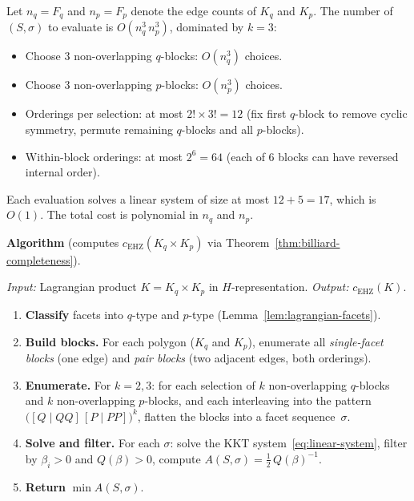 \begin{remark}[Complexity]\label{rem:billiard-complexity}
Let $n_q = F_q$ and $n_p = F_p$ denote the edge counts of $K_q$
and $K_p$.
The number of $(S, \sigma)$ to evaluate is
$O(n_q^3 \, n_p^3)$, dominated by $k = 3$:
\begin{itemize}
\item Choose $3$ non-overlapping $q$-blocks: $O(n_q^3)$ choices.
\item Choose $3$ non-overlapping $p$-blocks: $O(n_p^3)$ choices.
\item Orderings per selection: at most $2! \times 3! = 12$
  (fix first $q$-block to remove cyclic symmetry,
  permute remaining $q$-blocks and all $p$-blocks).
\item Within-block orderings: at most $2^6 = 64$
  (each of 6 blocks can have reversed internal order).
\end{itemize}
Each evaluation solves a linear system of size at most
$12 + 5 = 17$, which is $O(1)$.
The total cost is polynomial in $n_q$ and $n_p$.
\end{remark}

\medskip
\noindent\textbf{Algorithm}\label{alg:billiard}
(computes $c_{\mathrm{EHZ}}(K_q \times K_p)$
via Theorem~\ref{thm:billiard-completeness}).

\smallskip\noindent
\emph{Input:} Lagrangian product $K = K_q \times K_p$ in
$H$-representation.
\quad
\emph{Output:} $c_{\mathrm{EHZ}}(K)$.

\begin{enumerate}
\item \textbf{Classify} facets into $q$-type and $p$-type
  (Lemma~\ref{lem:lagrangian-facets}).
\item \textbf{Build blocks.}
  For each polygon ($K_q$ and $K_p$), enumerate all
  \emph{single-facet blocks} (one edge) and
  \emph{pair blocks} (two adjacent edges, both orderings).
\item \textbf{Enumerate.}
  For $k = 2, 3$: for each selection of $k$ non-overlapping
  $q$-blocks and $k$ non-overlapping $p$-blocks, and each
  interleaving into the pattern
  $\bigl([Q \mid QQ]\,[P \mid PP]\bigr)^k$,
  flatten the blocks into a facet sequence~$\sigma$.
\item \textbf{Solve and filter.}
  For each $\sigma$: solve the KKT system~\eqref{eq:linear-system},
  filter by $\beta_i > 0$ and $Q(\beta) > 0$, compute
  $A(S, \sigma) = \tfrac{1}{2}\, Q(\beta)^{-1}$.
\item \textbf{Return} $\min A(S, \sigma)$.
\end{enumerate}
